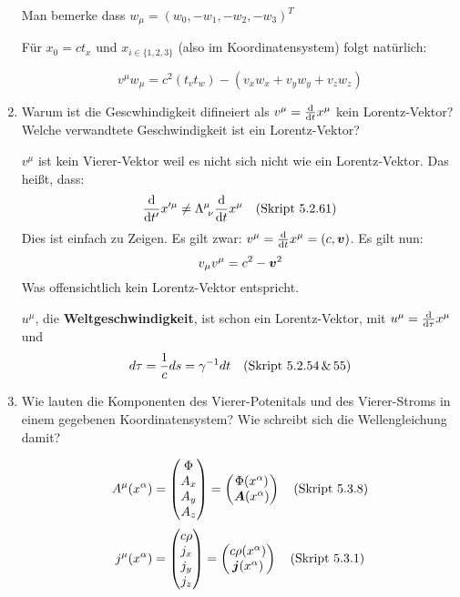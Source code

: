 \begin{enumerate}
    Man bemerke dass $w_\mu=(w_0, -w_1, -w_2, -w_3)^T$

    Für $x_0=ct_x$ und $x_{i\in\{1,2,3\}}$ (also im Koordinatensystem) 
    folgt natürlich:

    \begin{equation*}
      v^\mu w_\mu = c^2(t_vt_w) - (v_xw_x + v_yw_y + v_zw_z)
    \end{equation*}

  \item Warum ist die Gescwhindigkeit difineiert als $v^\mu=\dv t x^\mu$ %
    kein Lorentz-Vektor? Welche verwandtete Geschwindigkeit ist ein
    Lorentz-Vektor?

    $v^\mu$ ist kein Vierer-Vektor weil es nicht sich nicht
    wie ein Lorentz-Vektor. Das heißt, dass:
    \begin{equation*}
      \dv {t'} x'^\mu \neq \Lambda^{\mu}_{\ \nu}\dv t x^\mu
      \quad\text{(Skript 5.2.61)}
    \end{equation*}
    Dies ist einfach zu Zeigen. Es gilt zwar: 
    $v^\mu=\dv t x^\mu=(c,\vb* v)$. Es gilt nun:
    \begin{equation*}
      v_\mu v^\mu = c^2-\vb* v^2
    \end{equation*}
    Was offensichtlich kein Lorentz-Vektor entspricht.

    $u^\mu$, die \textbf{Weltgeschwindigkeit}, 
    ist schon ein Lorentz-Vektor,
    mit $u^\mu=\dv \tau x^\mu$ und
    $$d\tau=\frac{1}{c}ds=\gamma^{-1}dt \quad\text{(Skript 5.2.54\,\&\,55)}$$

  \item Wie lauten die Komponenten des Vierer-Potenitals und des %
    Vierer-Stroms in einem gegebenen Koordinatensystem? Wie schreibt
    sich die Wellengleichung damit?

    \begin{equation*}
      A^\mu(x^\alpha)=
      \begin{pmatrix}
        \Phi\\ A_x\\ A_y\\ A_z
      \end{pmatrix}
      =
      \begin{pmatrix}
        \Phi(x^\alpha) \\ \vb* A(x^\alpha)
      \end{pmatrix}
      \quad\text{(Skript 5.3.8)}
    \end{equation*}
    \begin{equation*}
      j^\mu(x^\alpha) =
      \begin{pmatrix}
        c\rho\\ j_x\\ j_y\\ j_z
      \end{pmatrix}
      =
      \begin{pmatrix}
        c\rho(x^\alpha) \\ \vb* j(x^\alpha)
      \end{pmatrix}
      \quad\text{(Skript 5.3.1)}
    \end{equation*}


\end{enumerate}
